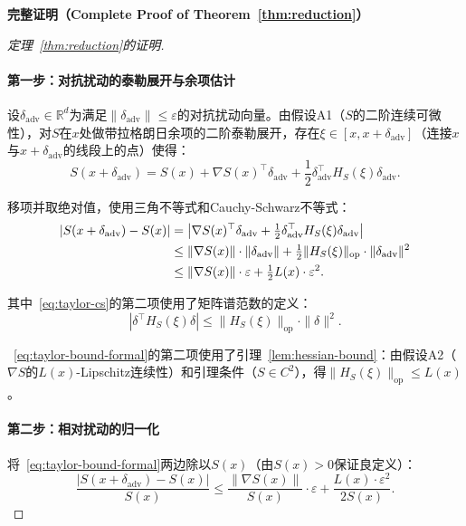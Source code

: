 \documentclass[12pt,a4paper]{article}
\newcommand{\R}{\mathbb{R}}
\newcommand{\op}{\mathrm{op}}
\newcommand{\adv}{\mathrm{adv}}
\begin{document}
\medskip\noindent
\textbf{完整证明（Complete Proof of Theorem~\ref{thm:reduction}）}

\begin{proof}[定理~\ref{thm:reduction}的证明]

\paragraph{第一步：对抗扰动的泰勒展开与余项估计}
设$\delta_{\adv} \in \R^d$为满足$\|\delta_{\adv}\| \leq \varepsilon$的对抗扰动向量。由假设A1（$S$的二阶连续可微性），对$S$在$x$处做带拉格朗日余项的二阶泰勒展开，存在$\xi \in [x, x+\delta_{\adv}]$（连接$x$与$x+\delta_{\adv}$的线段上的点）使得：
\begin{equation}\label{eq:formal-taylor}
S(x+\delta_{\adv}) = S(x) + \nabla S(x)^\top \delta_{\adv} + \frac12 \delta_{\adv}^\top H_S(\xi) \delta_{\adv}.
\end{equation}

移项并取绝对值，使用三角不等式和Cauchy-Schwarz不等式：
\begin{align}
|S(x+\delta_{\adv}) - S(x)|
&= \bigl| \nabla S(x)^\top \delta_{\adv} + \tfrac12 \delta_{\adv}^\top H_S(\xi) \delta_{\adv} \bigr| \notag \\
&\leq \|\nabla S(x)\| \cdot \|\delta_{\adv}\| + \tfrac12 \|H_S(\xi)\|_{\op} \cdot \|\delta_{\adv}\|^2 \label{eq:taylor-cs} \\
&\leq \|\nabla S(x)\| \cdot \varepsilon + \tfrac12 L(x) \cdot \varepsilon^2. \label{eq:taylor-bound-formal}
\end{align}

其中~\eqref{eq:taylor-cs}的第二项使用了矩阵谱范数的定义：
\[
|\delta^\top H_S(\xi) \delta| \leq \|H_S(\xi)\|_{\op} \cdot \|\delta\|^2.
\]

~\eqref{eq:taylor-bound-formal}的第二项使用了引理~\ref{lem:hessian-bound}：由假设A2（$\nabla S$的$L(x)$-Lipschitz连续性）和引理条件（$S \in C^2$），得$\|H_S(\xi)\|_{\op} \leq L(x)$。

\paragraph{第二步：相对扰动的归一化}
将~\eqref{eq:taylor-bound-formal}两边除以$S(x)$（由$S(x) > 0$保证良定义）：
\begin{equation}\label{eq:norm-step}
\frac{|S(x+\delta_{\adv}) - S(x)|}{S(x)}
\leq \frac{\|\nabla S(x)\|}{S(x)} \cdot \varepsilon
    + \frac{L(x) \cdot \varepsilon^2}{2 S(x)}.
\end{equation}


\end{proof}
\end{document}
